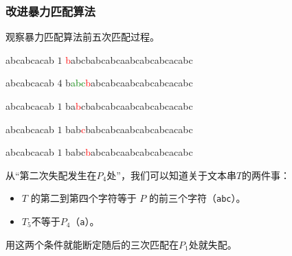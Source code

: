 \documentclass{ctexbeamer}
\newcommand{\red}[1]{\textcolor{red}{#1}}
\newcommand{\green}[1]{\textcolor{green}{#1}}
\newcommand{\str}[1]{\texttt{#1}}
\begin{document}
\begin{frame}[fragile]
\frametitle{改进暴力匹配算法}

观察暴力匹配算法前五次匹配过程。

	\begin{tverb}[frame=bottomline, fontsize=\small]
abcabcacab \(1\)
\red{b}abcbabcabcaabcabcabcacabc
	\end{tverb}

\begin{tverb}[frame=bottomline, fontsize=\small]
 abcabcacab \(4\)
b\green{abc}\red{b}abcabcaabcabcabcacabc
	\end{tverb}


	\begin{tverb}[frame=bottomline, fontsize=\small]
  abcabcacab \(1\)
ba\red{b}cbabcabcaabcabcabcacabc
	\end{tverb}

	\begin{tverb}[frame=bottomline, fontsize=\small]
   abcabcacab \(1\)
bab\red{c}babcabcaabcabcabcacabc
	\end{tverb}

	\begin{tverb}[frame=bottomline, fontsize=\small]
    abcabcacab \(1\)
babc\red{b}abcabcaabcabcabcacabc
	\end{tverb}

从``第二次失配发生在$P_4$处''，我们可以知道关于文本串$T$的两件事：
\begin{itemize}
\item $T$ 的第二到第四个字符等于 $P$ 的前三个字符（\str{abc}）。
\item $T_5$不等于$P_4$（\str{a}）。
\end{itemize}
用这两个条件就能断定随后的三次匹配在$P_1$处就失配。


\end{frame}
\end{document}
